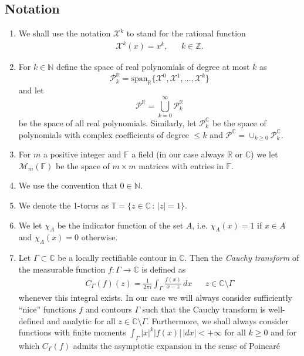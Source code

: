 \documentclass[12pt]{article}
\theoremstyle{definition}
\begin{document}
\newpage
\subsection{Notation}

\begin{enumerate}
\item We shall use the notation $\mathscr{X}^k$ to stand for the rational function
\begin{align*}
\mathscr{X}^k(x) = x^k , & & k \in \mathbb{Z}.
\end{align*}
\item For $k \in \mathbb{N}$ define the space of real polynomials of degree at most $k$ as
$$\mathscr{P}_{k}^\mathbb{R} = \mathrm{span}_\mathbb{R}\{ \mathscr{X}^0 , \mathscr{X}^1 , \dots, \mathscr{X}^k \}$$
and let
$$\mathscr{P}^\mathbb{R} = \bigcup_{k=0}^\infty \mathscr{P}_k^\mathbb{R}$$
be the space of all real polynomials. Similarly,  let $\mathscr{P}^\mathbb{C}_k$  be the space of polynomials with complex coefficients of degree $\leq k$ and $\mathscr{P}^\mathbb{C} = \cup_{k \geq 0} \mathscr{P}^\mathbb{C}_k$. 
\item For $m$ a positive integer and $\mathbb{F}$ a field (in our case always $\mathbb{R}$ or $\mathbb{C}$) we let $\mathcal{M}_m (\mathbb{F})$ be the space of $m \times m$ matrices with entries in $\mathbb{F}$.
\item We use the convention that $0 \in \mathbb{N}$. 
\item We denote the 1-torus as $\mathbb{T} = \{ z \in \mathbb{C} \, : \, |z|=1 \}$.
\item We let $\chi_A$ be the indicator function of the set $A$, i.e. $\chi_A(x) = 1$ if $x \in A$ and $\chi_A(x) = 0$ otherwise.
\item Let $\Gamma \subset \mathbb{C}$ be a locally rectifiable contour in $\mathbb{C}$. Then the \textit{Cauchy transform} of the measurable function $f : \Gamma \to \mathbb{C}$ is defined as
\begin{align*}
C_\Gamma (f) (z) = \frac{1}{2\pi i}\int_\Gamma \frac{f(x)}{x-z}\, dx & & z \in \mathbb{C}\setminus \Gamma
\end{align*}
whenever this integral exists. In our case we will always consider sufficiently \enquote{nice} functions $f$ and contours $\Gamma$ such that the Cauchy transform is well-defined and analytic for all $z \in \mathbb{C}\setminus \Gamma$.  Furthermore, we shall always consider functions with finite moments $\int_\Gamma |x|^k |f(x)| \, |dx| < +\infty$ for all $k\geq 0$ and for which $C_\Gamma (f)$ admits the asymptotic expansion in the sense of Poincaré

\end{enumerate}
\end{document}

